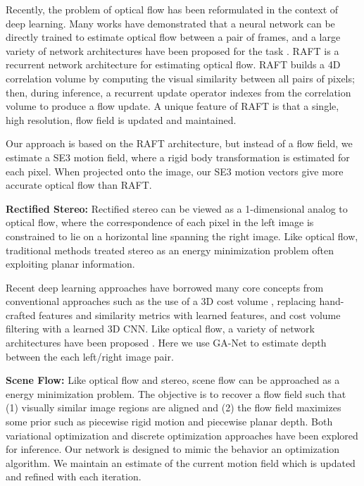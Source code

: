 \documentclass[final]{cvpr}
\begin{document}
Recently, the problem of optical flow has been reformulated in the context of deep learning. Many works have demonstrated that a neural network can be directly trained to estimate optical flow between a pair of frames, and a large variety of network architectures have been proposed for the task \cite{flownet1,flownet2,pwcnet,ranjan2017optical,lu2020devon,yang2019volumetric,teed2020raft}. RAFT\cite{teed2020raft} is a recurrent network architecture for estimating optical flow. RAFT builds a 4D correlation volume by computing the visual similarity between all pairs of pixels; then, during inference, a recurrent update operator indexes from the correlation volume to produce a flow update. A unique feature of RAFT is that a single, high resolution, flow field is updated and maintained. 

Our approach is based on the RAFT architecture, but instead of a flow field, we estimate a SE3 motion field, where a rigid body transformation is estimated for each pixel. When projected onto the image, our SE3 motion vectors give more accurate optical flow than RAFT.

\vspace{1mm} \noindent \textbf{Rectified Stereo:} Rectified stereo can be viewed as a 1-dimensional analog to optical flow, where the correspondence of each pixel in the left image is constrained to lie on a horizontal line spanning the right image. Like optical flow, traditional methods treated stereo as an energy minimization problem\cite{hirschmuller2005accurate,ranftl2012pushing} often exploiting planar information\cite{bleyer2011patchmatch}. 

Recent deep learning approaches have borrowed many core concepts from conventional approaches such as the use of a 3D cost volume \cite{gcnet}, replacing hand-crafted features and similarity metrics with learned features, and cost volume filtering with a learned 3D CNN. Like optical flow, a variety of network architectures have been proposed \cite{gcnet,zhang2019ga,guo2019group,chang2018pyramid}. Here we use GA-Net\cite{zhang2019ga} to estimate depth between the each left/right image pair.

\vspace{1mm} \noindent \textbf{Scene Flow:} Like optical flow and stereo, scene flow can be approached as a energy minimization problem. The objective is to recover a flow field such that (1) visually similar image regions are aligned and (2) the flow field maximizes some prior such as piecewise rigid motion and piecewise planar depth. Both variational optimization\cite{quiroga2014dense,jaimez2015motion,jaimez2015primal} and discrete optimization\cite{menze2015object,jaimez2015primal} approaches have been explored for inference. Our network is designed to mimic the behavior an optimization algorithm. We maintain an estimate of the current motion field which is updated and refined with each iteration.
\end{document}
